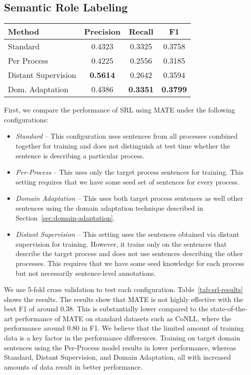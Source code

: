 \subsection{Semantic Role Labeling}
\begin{table*}[htdp]
\begin{center}
\begin{tabular}{|l|c|c|c|}
\hline
Method			& 	Precision	&	Recall	&	F1\\
\hline
Standard			& 	0.4323	& 	0.3325	&	0.3758\\
Per Process		&	0.4225	& 	0.2556	& 	0.3185\\
Distant Supervision 	& 	{\bf 0.5614}	& 	0.2642	& 	0.3594 \\
Dom. Adaptation	& 	0.4386	& 	{\bf 0.3351}	& 	{\bf 0.3799}\\
\hline
\end{tabular}
\end{center}
\caption{Semantic Role Labeling Performance. Bold face entries indicate the best performance.}
\label{tab:srl-results}
\end{table*}%

First, we compare the performance of SRL using MATE under the following configurations:
\begin{itemize}
\item {\em Standard} -- This configuration uses sentences from all processes combined together for training and does not distinguish at test time whether the sentence is describing a particular process.
\item {\em Per-Process} -- This uses only the target process sentences for training. This setting requires that we have some seed set of sentences for every process.
\item {\em Domain Adaptation} -- This uses both target process sentences as well other sentences using the domain adaptation technique described in Section~\ref{sec:domain-adaptation}.
\item {\em Distant Supervision} -- This setting uses the sentences obtained via distant supervision for training. 
However, it trains only on the sentences that describe the target process and does not use sentences describing the other processes. 
This requires that we have some seed knowledge for each process but not necessarily sentence-level annotations.
\end{itemize}

We use 5-fold cross validation to test each configuration.
Table~\ref{tab:srl-results} shows the results. 
The results show that MATE is not highly effective with the best F1 of around 0.38. 
This is substantially lower compared to the state-of-the-art performance of MATE on standard datasets such as CoNLL, where the performance around 0.80 in F1. 
We believe that the limited amount of training data is a key factor in the performance differences.
Training on target domain sentences using the Per-Process model results in lower performance, whereas Standard, Distant Supervision, and Domain Adaptation, all with increased amounts of data result in better performance. 

